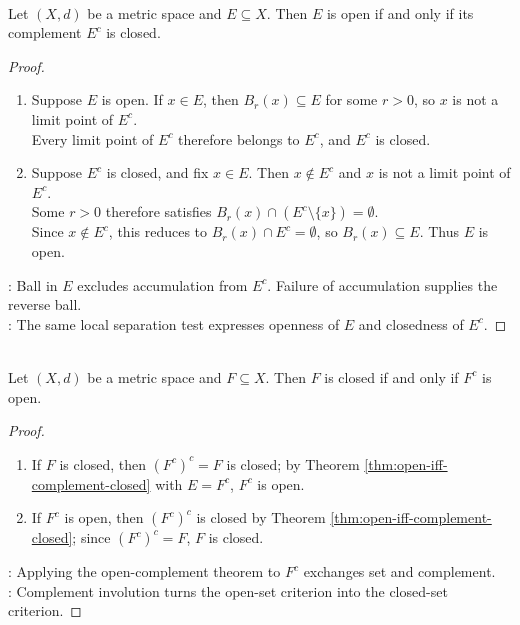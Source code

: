 \begin{theorem} \label{thm:open-iff-complement-closed} \\
Let $(X,d)$ be a metric space and $E\subseteq X$. Then $E$ is open if and only if its complement $E^c$ is closed.
\begin{proof}
\begin{enumerate}[label=\roman*.]
\setlength{\itemsep}{0pt}
\item[$(\Rightarrow)$] Suppose $E$ is open. If $x\in E$, then $B_r(x)\subseteq E$ for some $r>0$, so $x$ is not a limit point of $E^c$.\\
Every limit point of $E^c$ therefore belongs to $E^c$, and $E^c$ is closed.
\item[$(\Leftarrow)$] Suppose $E^c$ is closed, and fix $x\in E$. Then $x\notin E^c$ and $x$ is not a limit point of $E^c$.\\
Some $r>0$ therefore satisfies $B_r(x)\cap(E^c\setminus\{x\})=\emptyset$.\\
Since $x\notin E^c$, this reduces to $B_r(x)\cap E^c=\emptyset$, so $B_r(x)\subseteq E$. Thus $E$ is open.
\end{enumerate}
: Ball in $E$ excludes accumulation from $E^c$. Failure of accumulation supplies the reverse ball.\\
: The same local separation test expresses openness of $E$ and closedness of $E^c$.
\end{proof}
\end{theorem}

\begin{corollary} \label{cor:closed-iff-complement-open} \\
Let $(X,d)$ be a metric space and $F\subseteq X$. Then $F$ is closed if and only if $F^c$ is open.
\begin{proof}
\begin{enumerate}[label=\roman*.]
\setlength{\itemsep}{0pt}
\item[$(\Rightarrow)$] If $F$ is closed, then $(F^c)^c=F$ is closed; by Theorem \ref{thm:open-iff-complement-closed} with $E=F^c$, $F^c$ is open.
\item[$(\Leftarrow)$] If $F^c$ is open, then $(F^c)^c$ is closed by Theorem \ref{thm:open-iff-complement-closed}; since $(F^c)^c=F$, $F$ is closed.
\end{enumerate}
: Applying the open-complement theorem to $F^c$ exchanges set and complement.\\
: Complement involution turns the open-set criterion into the closed-set criterion.
\end{proof}
\end{corollary}

